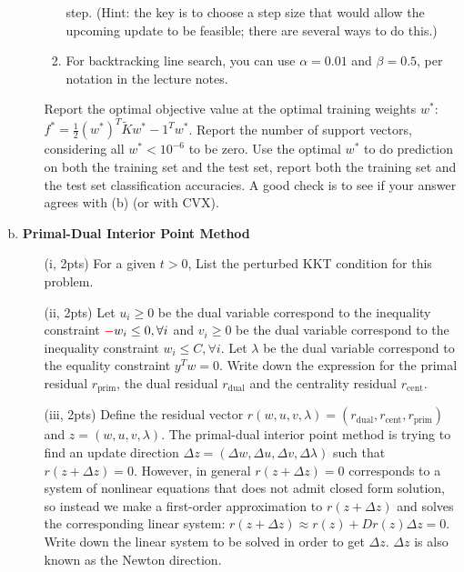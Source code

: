 \documentclass{article}
\theoremstyle{remark}
\theoremstyle{definition}
\begin{document}
\begin{enumerate}[(a)]
\begin{enumerate}[(i)]
\begin{enumerate}
        step. (Hint: the key is to choose a step size that would allow the
        upcoming update to be feasible; there are several ways to do this.)
      \item For backtracking line search, you can use $\alpha = 0.01$ and
        $\beta = 0.5$, per notation in the lecture notes.
    \end{enumerate}
    Report the optimal objective value at the optimal training weights $w^*$:
    $f^* = \frac{1}{2}(w^*)^T\tilde{K}w^* - 1^Tw^*$. Report the number of
    support vectors, considering all $w^*<10^{-6}$ to be zero. Use the optimal
    $w^*$ to do prediction on both the training set and the test set, report
    both the training set and the test set classification accuracies. A good
    check is to see if your answer agrees with (b) (or with CVX).
  \end{enumerate}




\item \textbf{Primal-Dual Interior Point Method}
  \begin{enumerate}[(i)]
      \item[(i, 2pts)] For a given $t > 0$,
        List the perturbed KKT condition for this problem.

\item[(ii, 2pts)] Let $u_i \geq 0$ be the dual variable correspond to the
  inequality constraint ${\textcolor{red} -w_i\leq 0}, \forall i$ and $v_i\geq 0$ be the dual
  variable correspond to the inequality constraint $w_i\leq C, \forall i$. Let $\lambda$ be the dual variable correspond to the equality constraint $y^Tw = 0$. Write down the expression for the primal residual $r_{\text{prim}}$, the dual residual $r_{\text{dual}}$ and the centrality residual $r_{\text{cent}}$. 

\item[(iii, 2pts)] Define the residual vector $r(w, u, v, \lambda) = (r_{\text{dual}}, r_{\text{cent}}, r_{\text{prim}})$ and $z = (w, u, v, \lambda)$. The primal-dual interior point method is trying to find an update direction $\Delta z = (\Delta w, \Delta u, \Delta v, \Delta\lambda)$ such that $r(z + \Delta z) = 0$. However, in general $r(z + \Delta z) = 0$ corresponds to a system of nonlinear equations that does not admit closed form solution, so instead we make a first-order approximation to $r(z + \Delta z)$ and solves the corresponding linear system: $r(z + \Delta z)\approx r(z) + Dr(z)\Delta z = 0$. Write down the linear system to be solved in order to get $\Delta z$. $\Delta z$ is also known as the Newton direction.


\end{enumerate}
\end{enumerate}
\end{document}
